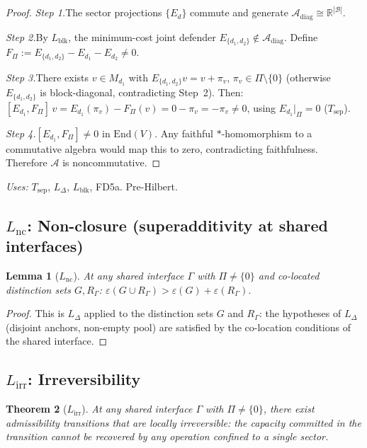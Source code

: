 \documentclass[11pt]{article}
\newtheorem{theorem_app}{Theorem}[section]
\newtheorem{lemma_app}[theorem_app]{Lemma}
\theoremstyle{definition}
\begin{document}
\begin{proof}
\textit{Step 1.}\quad The sector projections $\{E_d\}$ commute and
generate $\mathcal{A}_{\mathrm{diag}} \cong \mathbb{R}^{|\mathcal{B}|}$.

\textit{Step 2.}\quad By $L_{\mathrm{blk}}$, the minimum-cost joint
defender $E_{\{d_1,d_2\}} \notin \mathcal{A}_{\mathrm{diag}}$.
Define $F_\Pi := E_{\{d_1,d_2\}} - E_{d_1} - E_{d_2} \ne 0$.

\textit{Step 3.}\quad There exists $v \in M_{d_1}$ with
$E_{\{d_1,d_2\}} v = v + \pi_v$, $\pi_v \in \Pi \setminus \{0\}$
(otherwise $E_{\{d_1,d_2\}}$ is block-diagonal, contradicting Step~2).
Then:
$[E_{d_1}, F_\Pi]\,v = E_{d_1}(\pi_v) - F_\Pi(v) = 0 - \pi_v
= -\pi_v \ne 0$,
using $E_{d_1}|_\Pi = 0$ ($T_{\mathrm{sep}}$).

\textit{Step 4.}\quad $[E_{d_1}, F_\Pi] \ne 0$ in $\mathrm{End}(V)$.
Any faithful $*$-homomorphism to a commutative algebra would map this
to zero, contradicting faithfulness.  Therefore $\mathcal{A}$ is
noncommutative.
\end{proof}

\noindent\textit{Uses:} $T_{\mathrm{sep}}$, $L_\Delta$,
$L_{\mathrm{blk}}$, FD5a.  Pre-Hilbert.


\subsection{$L_{\mathrm{nc}}$: Non-closure (superadditivity at shared
interfaces)}
\label{app:Lnc}

\begin{lemma_app}[$L_{\mathrm{nc}}$]
At any shared interface $\Gamma$ with $\Pi \ne \{0\}$ and
co-located distinction sets $G, R_\Gamma$:
$\varepsilon(G \cup R_\Gamma) > \varepsilon(G)
+ \varepsilon(R_\Gamma)$.
\end{lemma_app}

\begin{proof}
This is $L_\Delta$ applied to the distinction sets $G$ and $R_\Gamma$:
the hypotheses of $L_\Delta$ (disjoint anchors, non-empty pool) are
satisfied by the co-location conditions of the shared interface.
\end{proof}


\subsection{$L_{\mathrm{irr}}$: Irreversibility}
\label{app:Lirr}

\begin{theorem_app}[$L_{\mathrm{irr}}$]
At any shared interface $\Gamma$ with $\Pi \ne \{0\}$, there exist
admissibility transitions that are locally irreversible: the capacity
committed in the transition cannot be recovered by any operation
confined to a single sector.
\end{theorem_app}
\end{document}
